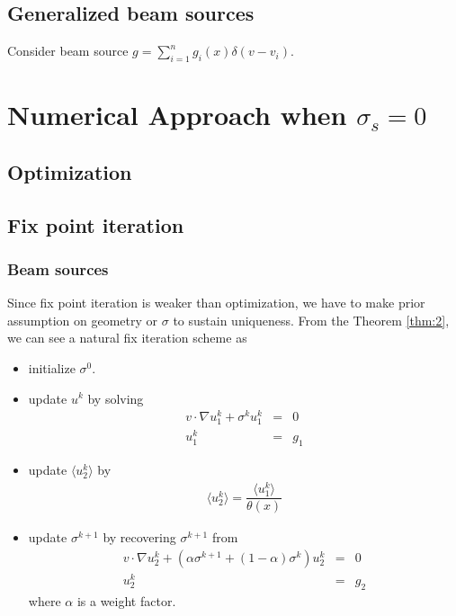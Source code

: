 \documentclass[12pt,a4paper]{article}
\newcommand{\avg}[1]{\langle#1\rangle}
\begin{document}
\subsection{Generalized beam sources}
Consider beam source $g = \sum_{i=1}^n g_i(x)\delta(v-v_i)$.
\section{Numerical Approach when $\sigma_s = 0$}
\subsection{Optimization}

\subsection{Fix point iteration}
\subsubsection{Beam sources}
Since fix point iteration is weaker than optimization, we have to make prior assumption on geometry or $\sigma$ to sustain uniqueness.
From the Theorem \ref{thm:2}, we can see a natural fix iteration scheme as 
\begin{itemize}
\item initialize $\sigma^0$.
\item update $u^k$ by solving
\begin{eqnarray}
v\cdot \nabla u_1^k  + \sigma^k u_1^k &=& 0 \\
u_1^k &=& g_1
\end{eqnarray}
\item update $\avg{u_2^k}$ by 
\begin{eqnarray}
\avg{u_2^k} = \dfrac{\avg{u_1^k}}{\theta(x)}
\end{eqnarray}
\item update $\sigma^{k+1}$ by recovering $\sigma^{k+1}$ from
\begin{eqnarray}
v\cdot\nabla u_2^k  + (\alpha\sigma^{k+1} + (1-\alpha)\sigma^k) u_2^k &=& 0\\
u_2^k &=& g_2
\end{eqnarray}
where $\alpha$ is a weight factor.
\end{itemize}
\end{document}
